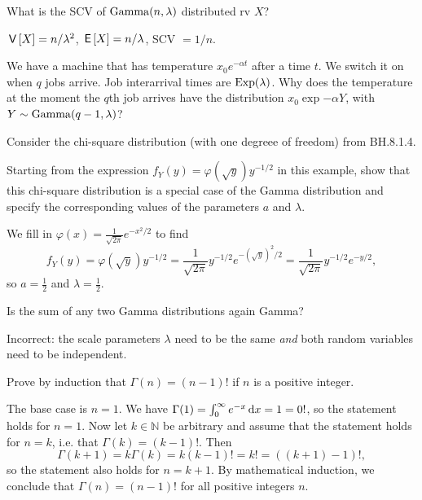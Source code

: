 \begin{exercise}
What is the SCV of $\mathrm{Gamma}(n, \lambda)$ distributed rv $X$?
\begin{solution}
$\,\mathsf{V}\left[X\right] = n/\lambda^{2}$, $\,\mathsf{E}\left[X\right] = n/\lambda$, SCV $=1/n$.
\end{solution}
\end{exercise}

\begin{exercise}
We have a machine that has temperature $x_0e^{-\alpha t}$ after a time $t$. We switch it on when $q$ jobs arrive. Job interarrival times are $\mathrm{Exp}(\lambda)$. Why  does the temperature at the moment the $q$th job arrives have the distribution $x_0\exp{-\alpha Y}$, with $Y\sim \mathrm{Gamma}(q-1, \lambda)$?
\begin{solution}
\end{solution}
\end{exercise}



\begin{exercise}
Consider the chi-square distribution (with one degreee of freedom) from BH.8.1.4.

Starting from the expression $f_Y(y) = \varphi \left(\sqrt{y}\right) y^{-1/2}$ in this example, show that this  chi-square distribution is a special case of the Gamma distribution and specify the corresponding values of the parameters $a$ and $\lambda$.

\begin{solution} We fill in $\varphi(x) = \frac{1}{\sqrt{2\pi}} e^{-x^2/2}$ to find
\begin{equation*} f_Y(y) = \varphi \left(\sqrt{y}\right) y^{-1/2} = \frac{1}{\sqrt{2\pi}} y^{-1/2} e^{-(\sqrt{y})^2/2} = \frac{1}{\sqrt{2\pi}} y^{-1/2} e^{-y/2}, \end{equation*} so $a = \tfrac12$ and $\lambda = \tfrac12$.
\end{solution}
\end{exercise}

\begin{exercise}
Is the sum of any two Gamma distributions again Gamma?
\begin{solution}
Incorrect: the scale parameters $\lambda$ need to be the same \emph{and} both random variables need to be independent.
\end{solution}
\end{exercise}

\begin{exercise}
Prove by induction that $\Gamma(n)=(n-1)!$ if $n$ is a positive integer.

\begin{solution}
The base case is $n=1$. We have $\Gamma(1) = \int_0^\infty e^{-x} \,\textrm{d}x = 1 = 0!$, so the statement holds for $n=1$. Now let $k \in \mathbb N$ be arbitrary and assume that the statement holds for $n=k$, i.e. that $\Gamma(k) = (k-1)!$. Then \begin{equation}\Gamma(k+1) = k\Gamma(k) = k (k-1)! = k! = ((k+1)-1)!,
\end{equation}
so the statement also holds for $n=k+1$. By mathematical induction, we conclude that  $\Gamma(n)=(n-1)!$ for all positive integers $n$.
\end{solution}
\end{exercise}


